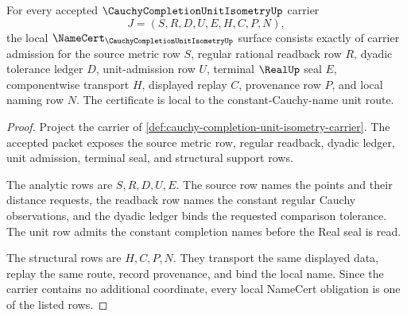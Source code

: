 \begin{theorem}
\label{thm:cauchy-completion-unit-isometry-namecert-obligations}
For every accepted $\CauchyCompletionUnitIsometryUp$ carrier
$$
J=(S,R,D,U,E,H,C,P,N),
$$
the local $\NameCert_{\CauchyCompletionUnitIsometryUp}$ surface consists
exactly of carrier admission for the source metric row $S$, regular rational
readback row $R$, dyadic tolerance ledger $D$, unit-admission row $U$,
terminal $\RealUp$ seal $E$, componentwise transport $H$, displayed replay
$C$, provenance row $P$, and local naming row $N$. The certificate is local to
the constant-Cauchy-name unit route.
\end{theorem}
\begin{proof}
Project the carrier of
\autoref{def:cauchy-completion-unit-isometry-carrier}. The accepted packet
exposes the source metric row, regular readback, dyadic ledger, unit admission,
terminal seal, and structural support rows.

The analytic rows are $S,R,D,U,E$. The source row names the points and their
distance requests, the readback row names the constant regular Cauchy
observations, and the dyadic ledger binds the requested comparison tolerance.
The unit row admits the constant completion names before the Real seal is read.

The structural rows are $H,C,P,N$. They transport the same displayed data,
replay the same route, record provenance, and bind the local name. Since the
carrier contains no additional coordinate, every local NameCert obligation is
one of the listed rows.
\end{proof}

